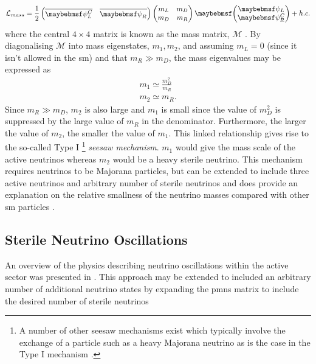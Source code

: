 \begin{equation}
    \mathcal{L}_{mass} = \frac{1}{2} 
    \begin{pmatrix}
    \overline{\psi_L^C} & \overline{\psi_R^{\phantom{C}}}
    \end{pmatrix}
    \begin{pmatrix}
    m_L & m_D \\
    m_D & m_R
    \end{pmatrix}
    \twomatrix {\psi_L} {\psi_R^C} + h.c.
\end{equation}
where the central $4 \times 4$ matrix is known as the mass matrix, $\mathcal{M}$ \cite{White_Paper}. By diagonalising $\mathcal{M}$ into mass eigenstates, $m_1, m_2$, and assuming $m_L = 0$ (since it isn't allowed in the \gls{sm}) and that $m_R \gg m_D$, the mass eigenvalues may be expressed as
\begin{equation}
\begin{split}
    m_1 \simeq \frac{m_D^2}{m_R} \\
    m_2 \simeq m_R.
\end{split}
\end{equation}
Since $m_R \gg m_D$, $m_2$ is also large and $m_1$ is small since the value of $m_D^2$ is suppressed by the large value of $m_R$ in the denominator. Furthermore, the larger the value of $m_2$, the smaller the value of $m_1$. This linked relationship gives rise to the so-called Type I \footnote{A number of other seesaw mechanisms exist which typically involve the exchange of a particle such as a heavy Majorana neutrino as is the case in the Type I mechanism \cite{White_Paper}.} \textit{seesaw mechanism}. $m_1$ would give the mass scale of the active neutrinos whereas $m_2$ would be a heavy sterile neutrino. This mechanism requires neutrinos to be Majorana particles, but can be extended to include three active neutrinos and arbitrary number of sterile neutrinos and does provide an explanation on the relative smallness of the neutrino masses compared with other \gls{sm} particles \cite{Fundamentals_of_Neutrino_Physics_and_Astrophysics}. 


\subsection{Sterile Neutrino Oscillations}\label{sec:sterile_neutrino_oscillations}
An overview of the physics describing neutrino oscillations within the active sector was presented in . This approach may be extended to included an arbitrary number of additional neutrino states by expanding the \gls{pmns} matrix to include the desired number of sterile neutrinos

